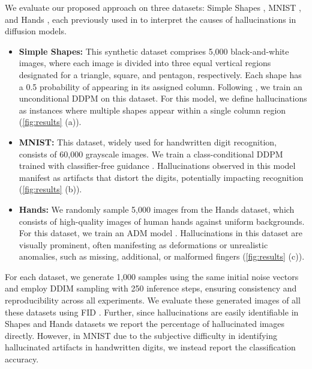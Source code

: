 We evaluate our proposed approach on three datasets: Simple Shapes \citep{aithal2024understanding}, MNIST \citep{lecun1998gradient}, and Hands \citep{afifi201911k}, each previously used in \citet{aithal2024understanding} to interpret the causes of hallucinations in diffusion models. 
% 
\begin{itemize}
    \item \textbf{Simple Shapes:} This synthetic dataset comprises 5,000 black-and-white images, where each image is divided into three equal vertical regions designated for a triangle, square, and pentagon, respectively. 
    Each shape has a 0.5 probability of appearing in its assigned column. 
    Following \citet{aithal2024understanding}, we train an unconditional DDPM \citep{sehwag2023minimaldiffusion} on this dataset. 
    For this model, we define hallucinations as instances where multiple shapes appear within a single column region (\eg \cref{fig:results} (a)). 

    \item \textbf{MNIST:} This dataset, widely used for handwritten digit recognition, consists of 60,000 grayscale images. 
    We train a class-conditional DDPM trained with classifier-free guidance \citep{ho2022cfg}. 
    Hallucinations observed in this model manifest as artifacts that distort the digits, potentially impacting recognition (\eg \cref{fig:results} (b)). 

    \item \textbf{Hands:} We randomly sample 5,000 images from the Hands dataset, which consists of high-quality images of human hands against uniform backgrounds.
    For this dataset, we train an ADM model \citep{nichol2021improved}.
    Hallucinations in this dataset are visually prominent, often manifesting as deformations or unrealistic anomalies, such as missing, additional, or malformed fingers (\eg \cref{fig:results} (c)).
\end{itemize}

For each dataset, we generate 1,000 samples using the same initial noise vectors and employ DDIM sampling with 250 inference steps, ensuring consistency and reproducibility across all experiments. 
We evaluate these generated images of all these datasets using FID \citep{heusel2017gans}. 
Further, since hallucinations are easily identifiable in Shapes and Hands datasets we report the percentage of hallucinated images directly. 
However, in MNIST due to the subjective difficulty in identifying hallucinated artifacts in handwritten digits, we instead report the classification accuracy.  


